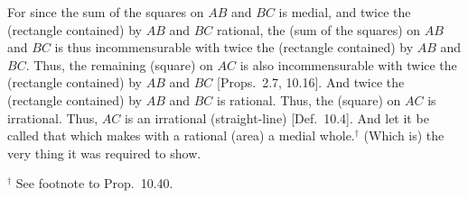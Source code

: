 \begin{Parallel}{}{}
{For since the sum of the squares on $AB$ and $BC$ is medial, and
twice the (rectangle contained) by $AB$ and $BC$ rational,
the (sum of the squares) on $AB$ and $BC$ is thus incommensurable
with twice the (rectangle contained) by $AB$ and $BC$. Thus, the
remaining (square) on $AC$ is also incommensurable with
twice the (rectangle contained) by $AB$ and $BC$ [Props.~2.7, 10.16]. And twice
the (rectangle contained) by $AB$ and $BC$ is rational. 
Thus, the (square) on $AC$ is irrational. Thus, $AC$ is an
irrational (straight-line) [Def.~10.4]. And let it be
called that which makes
with a rational (area) a medial whole.$^\dag$ (Which is) the very thing it
was required to show.}
\end{Parallel}
{\footnotesize\noindent$^\dag$ See footnote to Prop.~10.40.}

